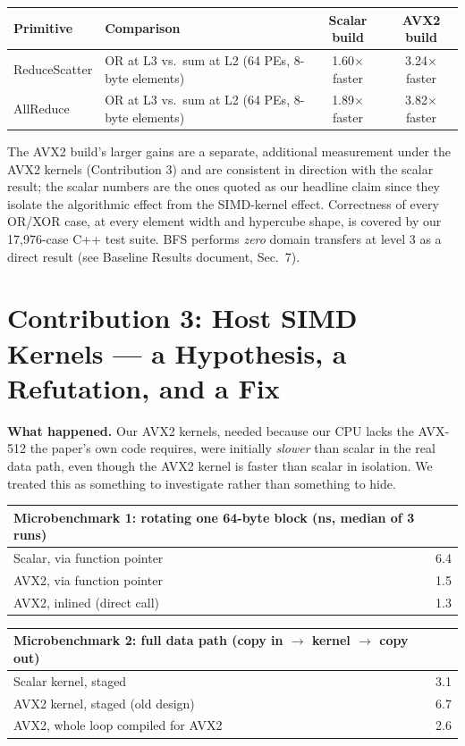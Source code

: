 \documentclass[11pt]{article}
\begin{document}
\begin{center}\small
\begin{tabular}{@{}llcc@{}}\toprule
Primitive & Comparison & Scalar build & AVX2 build \\\midrule
ReduceScatter & OR at L3 vs.\ sum at L2 (64 PEs, 8-byte elements) & 1.60$\times$ faster & 3.24$\times$ faster \\
AllReduce & OR at L3 vs.\ sum at L2 (64 PEs, 8-byte elements) & 1.89$\times$ faster & 3.82$\times$ faster \\
\bottomrule
\end{tabular}
\end{center}
\noindent The AVX2 build's larger gains are a separate, additional measurement under the AVX2 kernels (Contribution 3) and are consistent in direction with the scalar result; the scalar numbers are the ones quoted as our headline claim since they isolate the algorithmic effect from the SIMD-kernel effect. Correctness of every OR/XOR case, at every element width and hypercube shape, is covered by our 17{,}976-case C++ test suite. BFS performs \emph{zero} domain transfers at level 3 as a direct result (see Baseline Results document, Sec.~7).

\section{Contribution 3: Host SIMD Kernels --- a Hypothesis, a Refutation, and a Fix}
\textbf{What happened.} Our AVX2 kernels, needed because our CPU lacks the AVX-512 the paper's own code requires, were initially \emph{slower} than scalar in the real data path, even though the AVX2 kernel is faster than scalar in isolation. We treated this as something to investigate rather than something to hide.

\begin{center}\small
\begin{tabular}{@{}lc@{}}\toprule
Microbenchmark 1: rotating one 64-byte block (ns, median of 3 runs) & \\\midrule
Scalar, via function pointer & 6.4 \\
AVX2, via function pointer & 1.5 \\
AVX2, inlined (direct call) & 1.3 \\
\bottomrule
\end{tabular}
\quad
\begin{tabular}{@{}lc@{}}\toprule
Microbenchmark 2: full data path (copy in $\to$ kernel $\to$ copy out) & \\\midrule
Scalar kernel, staged & 3.1 \\
AVX2 kernel, staged (old design) & 6.7 \\
AVX2, whole loop compiled for AVX2 & 2.6 \\
\bottomrule
\end{tabular}
\end{center}
\end{document}
